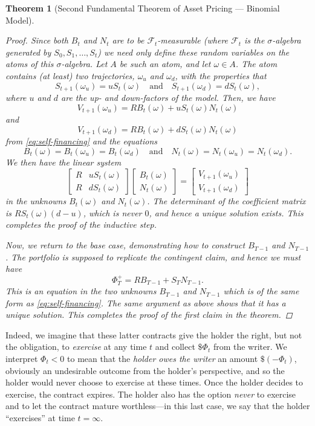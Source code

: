 \documentclass[11pt, openany, oneside]{book}
\newtheorem{thm}{Theorem}[section]
\theoremstyle{definition}
\theoremstyle{remark}
\theoremstyle{boldital}
\numberwithin{equation}{section}
\begin{document}
\begin{thm}[Second Fundamental Theorem of Asset Pricing --- Binomial Model]
\begin{proof}
Since both $B_t$ and $N_t$ are to be $\mathcal{F}_t$-measurable (where $\mathcal{F}_t$ is the $\sigma$-algebra generated by $S_0,S_1,\ldots,S_t$) we need only define these random variables on the atoms of this $\sigma$-algebra. Let $A$ be such an atom, and let $\omega \in A$. The atom contains (at least) two trajectories, $\omega_u$ and $\omega_d$, with the properties that
	\[
S_{t+1}(\omega_u) = u S_{t}(\omega) \quad \text{and} \quad S_{t+1}(\omega_d) = d S_{t}(\omega),
	\]
where $u$ and $d$ are the up- and down-factors of the model. Then, we have
	\[
	V_{t+1}(\omega_u) = R B_{t}(\omega) + uS_{t}(\omega) N_{t}(\omega)
	\]
and
	\[
	V_{t+1}(\omega_d) = R B_{t}(\omega) + dS_{t}(\omega) N_{t}(\omega)
	\]
from \eqref{eq:self-financing} and the equations
	\[B_t(\omega) = B_t(\omega_u) = B_t(\omega_d) \quad \text{and} \quad N_t(\omega) = N_t(\omega_u) = N_t(\omega_d).
	\]
We then have the linear system
	\begin{equation}\label{eq:linear-sys}
	\begin{bmatrix}
	R & uS_{t}(\omega) \\
	R & dS_{t}(\omega)
	\end{bmatrix}
	\begin{bmatrix} B_{t}(\omega) \\ N_{t}(\omega) \end{bmatrix} =
	\begin{bmatrix}
	V_{t+1}(\omega_u) \\
	V_{t+1}(\omega_d)
	\end{bmatrix}
	\end{equation}
in the unknowns $B_{t}(\omega)$ and $N_{t}(\omega)$. The determinant of the coefficient matrix is $RS_t(\omega)(d-u)$, which is never $0$, and hence a unique solution exists. This completes the proof of the inductive step.

Now, we return to the base case, demonstrating how to construct $B_{T-1}$ and $N_{T-1}$. The portfolio is supposed to replicate the contingent claim, and hence we must have
	\[
	\Phi^+_T = RB_{T-1} + S_T N_{T-1}.
	\]
This is an equation in the two unknowns $B_{T-1}$ and $N_{T-1}$ which is of the same form as \eqref{eq:self-financing}. The same argument as above shows that it has a unique solution. This completes the proof of the first claim in the theorem.
\end{proof}
\end{thm}


\newpage
Indeed, we imagine that these latter contracts give the holder the right, but not the obligation, to \textit{exercise} at any time $t$ and collect $\$\Phi_t$ from the writer. We interpret $\Phi_t<0$ to mean that the \textit{holder owes the writer} an amount $\$(-\Phi_t)$, obviously an undesirable outcome from the holder's perspective, and so the holder would never choose to exercise at these times. Once the holder decides to exercise, the contract expires. The holder also has the option \textit{never} to exercise and to let the contract mature worthless---in this last case, we say that the holder ``exercises'' at time $t=\infty$.
\end{document}
